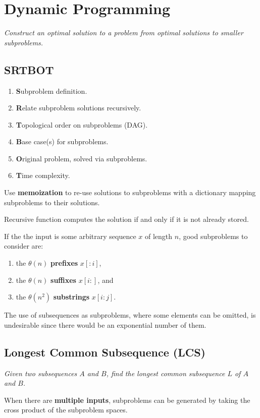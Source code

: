 \section{Dynamic Programming}
\emph{Construct an optimal solution to a problem from optimal solutions to smaller subproblems.}

\subsection{SRTBOT}
\begin{enumerate}
    \item \textbf{S}ubproblem definition.
    \item \textbf{R}elate subproblem solutions recursively.
    \item \textbf{T}opological order on subproblems (DAG).
    \item \textbf{B}ase case(s) for subproblems.
    \item \textbf{O}riginal problem, solved via subproblems.
    \item \textbf{T}ime complexity.
\end{enumerate}

Use \textbf{memoization} to re-use solutions to subproblems with
a dictionary mapping subproblems to their solutions.

Recursive function computes the solution if and only if it is not already stored.

If the the input is some arbitrary sequence $x$ of length $n$, good subproblems to consider are:
\begin{enumerate}
    \item the $\theta(n)$ \textbf{prefixes} $x[:i]$,
    \item the $\theta(n)$ \textbf{suffixes} $x[i:]$, and
    \item the $\theta(n^2)$ \textbf{substrings} $x[i:j]$.
\end{enumerate}

The use of subsequences as subproblems, where some elements can be omitted,
is undesirable since there would be an exponential number of them.

\subsection{Longest Common Subsequence (LCS)}
\emph{Given two subsequences $A$ and $B$, find the longest common subsequence $L$ of $A$ and $B$.}

When there are \textbf{multiple inputs}, subproblems can be generated by taking the cross product
of the subproblem spaces.

